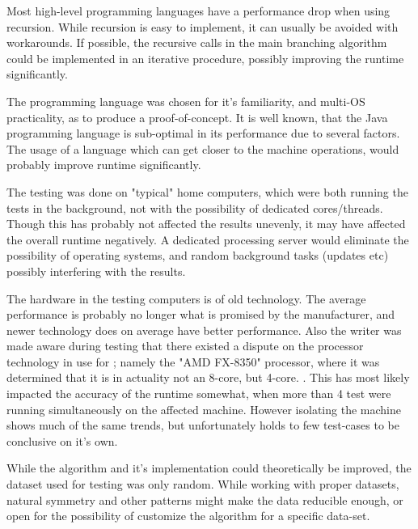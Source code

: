 \documentclass[a4paper]{article}
\begin{document}
Most high-level programming languages have a performance drop when using recursion. While recursion is easy to implement, it can
usually be avoided with workarounds. If possible, the recursive calls in the main branching algorithm could be implemented
in an iterative procedure, possibly improving the runtime significantly.

The programming language was chosen for it's familiarity, and multi-OS practicality, as to produce a proof-of-concept.
It is well known, that the Java programming language is sub-optimal in its performance due to several
factors. The usage of a language which can get closer to the machine operations, would probably improve
runtime significantly.

The testing was done on "typical" home computers, which were both running the tests in the background, not
with the possibility of dedicated cores/threads. Though this has probably not affected the results unevenly,
it may have affected the overall runtime negatively. A dedicated processing server would eliminate the
possibility of operating systems, and random background tasks (updates etc) possibly
interfering with the results.

The hardware in the testing computers is of old technology. The average performance is probably no longer what
is promised by the manufacturer, and newer technology does on average have better performance. Also the writer
was made aware during testing that there existed a dispute on the processor technology in use for ;
namely the "AMD FX-8350" processor, where it was determined that it is in actuality not an 8-core, but 4-core.
\cite{dickey_v._advanced_micro_devices:inc._2015,dickey_v._advanced_micro_devices:inc._2020,chaim_gartenberg_2019}. This
has most likely impacted the accuracy of the runtime somewhat, when more than 4 test were running simultaneously on
the affected machine. However isolating the machine shows much of the same trends, but unfortunately holds to few test-cases to
be conclusive on it's own.

While the algorithm and it's implementation could theoretically be improved, the dataset used for testing was only
random. While working with proper datasets, natural symmetry and other patterns might make the data reducible enough,
or open for the possibility of customize the algorithm for a specific data-set.




%
%
\newpage

\end{document}
